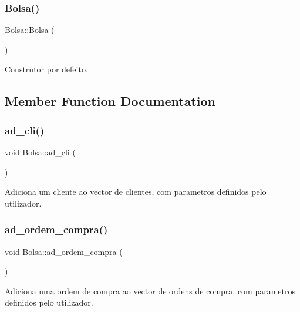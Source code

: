 \subsubsection{\texorpdfstring{Bolsa()}{Bolsa()}}
{\footnotesize\ttfamily Bolsa\+::\+Bolsa (\begin{DoxyParamCaption}{ }\end{DoxyParamCaption})\hspace{0.3cm}{\ttfamily [inline]}}



Construtor por defeito. 



\subsection{Member Function Documentation}
\hypertarget{class_bolsa_a8bcc217341ffe40e4f2b6d7454977d4d}{}\label{class_bolsa_a8bcc217341ffe40e4f2b6d7454977d4d} 
\subsubsection{\texorpdfstring{ad\+\_\+cli()}{ad\_cli()}}
{\footnotesize\ttfamily void Bolsa\+::ad\+\_\+cli (\begin{DoxyParamCaption}{ }\end{DoxyParamCaption})}



Adiciona um cliente ao vector de clientes, com parametros definidos pelo utilizador. 

\hypertarget{class_bolsa_a6567e62d4d1037ca2e2263ba7e22ea4e}{}\label{class_bolsa_a6567e62d4d1037ca2e2263ba7e22ea4e} 
\subsubsection{\texorpdfstring{ad\+\_\+ordem\+\_\+compra()}{ad\_ordem\_compra()}}
{\footnotesize\ttfamily void Bolsa\+::ad\+\_\+ordem\+\_\+compra (\begin{DoxyParamCaption}{ }\end{DoxyParamCaption})}



Adiciona uma ordem de compra ao vector de ordens de compra, com parametros definidos pelo utilizador. 

